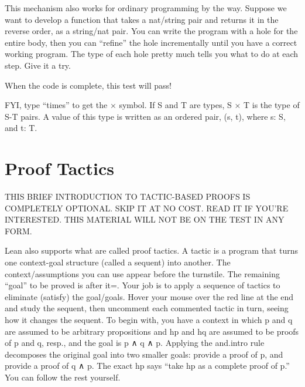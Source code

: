 \documentclass[letterpaper,10pt,english]{sphinxmanual}
\begin{document}
This mechanism also works for ordinary programming by the way. Suppose
we want to develop a function that takes a nat/string pair and returns
it in the reverse order, as a string/nat pair. You can write the
program with a hole for the entire body, then you can “refine” the
hole incrementally until you have a correct working program. The type
of each hole pretty much tells you what to do at each step.  Give it a
try.

\begin{sphinxVerbatim}[commandchars=\\\{\}]
        
     
\end{sphinxVerbatim}

When the code is complete, this test will pass!

\begin{sphinxVerbatim}[commandchars=\\\{\}]
         
\end{sphinxVerbatim}

FYI, type “times” to get the × symbol. If S and T are types, S × T is
the type of S-T pairs. A value of this type is written as an ordered
pair, (s, t), where s: S, and t: T.


\section{Proof Tactics}
\label{\detokenize{15-proofs:proof-tactics}}
THIS BRIEF INTRODUCTION TO TACTIC-BASED PROOFS IS COMPLETELY
OPTIONAL. SKIP IT AT NO COST. READ IT IF YOU’RE INTERESTED. THIS
MATERIAL WILL NOT BE ON THE TEST IN ANY FORM.

Lean also supports what are called proof tactics.  A tactic is a
program that turns one context-goal structure (called a sequent) into
another. The context/assumptions you can use appear before the
turnstile. The remaining “goal” to be proved is after it=. Your job is
to apply a sequence of tactics to eliminate (satisfy) the goal/goals.
Hover your mouse over the red line at the end and study the sequent,
then uncomment each commented tactic in turn, seeing how it changes
the sequent.  To begin with, you have a context in which p and q are
assumed to be arbitrary propositions and hp and hq are assumed to be
proofs of p and q, resp., and the goal is p ∧ q ∧ p. Applying the
and.intro rule decomposes the original goal into two smaller goals:
provide a proof of p, and provide a proof of q ∧ p. The exact hp says
“take hp as a complete proof of p.” You can follow the rest yourself.
\end{document}
